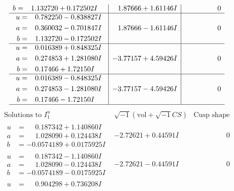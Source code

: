 \documentclass[1p]{elsarticle_modified}
\theoremstyle{definition}
\newcommand{\I}{\sqrt{-1}}
\begin{document}
$$\begin{array}{c|c|c}
\begin{aligned}
b &= \phantom{-}1.132720 + 0.172502 I\end{aligned}
 & \phantom{-}1.87666 + 1.61146 I & \phantom{-0.000000 } 0 \\ \hline\begin{aligned}
u &= \phantom{-}0.782250 - 0.838827 I \\
a &= \phantom{-}0.360032 - 0.701847 I \\
b &= \phantom{-}1.132720 - 0.172502 I\end{aligned}
 & \phantom{-}1.87666 - 1.61146 I & \phantom{-0.000000 } 0 \\ \hline\begin{aligned}
u &= \phantom{-}0.016389 + 0.848325 I \\
a &= \phantom{-}0.274853 + 1.281080 I \\
b &= \phantom{-}0.17466 + 1.72150 I\end{aligned}
 & -3.77157 + 4.59426 I & \phantom{-0.000000 } 0 \\ \hline\begin{aligned}
u &= \phantom{-}0.016389 - 0.848325 I \\
a &= \phantom{-}0.274853 - 1.281080 I \\
b &= \phantom{-}0.17466 - 1.72150 I\end{aligned}
 & -3.77157 - 4.59426 I & \phantom{-0.000000 } 0\\
 \hline 
 \end{array}$$\newpage$$\begin{array}{c|c|c}  
\text{Solutions to }I^u_{1}& \I (\text{vol} + \sqrt{-1}CS) & \text{Cusp shape}\\
 \hline 
\begin{aligned}
u &= \phantom{-}0.187342 + 1.140860 I \\
a &= \phantom{-}1.028090 + 0.124438 I \\
b &= -0.0574189 + 0.0175925 I\end{aligned}
 & -2.72621 + 0.44591 I & \phantom{-0.000000 } 0 \\ \hline\begin{aligned}
u &= \phantom{-}0.187342 - 1.140860 I \\
a &= \phantom{-}1.028090 - 0.124438 I \\
b &= -0.0574189 - 0.0175925 I\end{aligned}
 & -2.72621 - 0.44591 I & \phantom{-0.000000 } 0 \\ \hline\begin{aligned}
u &= \phantom{-}0.904298 + 0.736208 I \\

\end{aligned}
\end{array}$$
\end{document}
